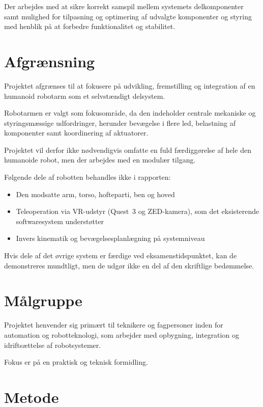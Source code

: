 Der arbejdes med at sikre korrekt samspil mellem systemets delkomponenter samt
mulighed for tilpasning og optimering af udvalgte komponenter og styring med
henblik på at forbedre funktionalitet og stabilitet.

\section{Afgrænsning}

Projektet afgrænses til at fokusere på udvikling, fremstilling og integration
af en humanoid robotarm som et selvstændigt delsystem.

Robotarmen er valgt som fokusområde, da den indeholder centrale mekaniske og
styringsmæssige udfordringer, herunder bevægelse i flere led, belastning af
komponenter samt koordinering af aktuatorer.

Projektet vil derfor ikke nødvendigvis omfatte en fuld færdiggørelse af hele
den humanoide robot, men der arbejdes med en modulær tilgang.

Følgende dele af robotten behandles ikke i rapporten:

\begin{itemize}
    \item Den modsatte arm, torso, hofteparti, ben og hoved
    \item Teleoperation via VR-udstyr (Quest~3 og ZED-kamera), som det
          eksisterende softwaresystem understøtter
    \item Invers kinematik og bevægelsesplanlægning på systemniveau
\end{itemize}

Hvis dele af det øvrige system er færdige ved eksamenstidspunktet, kan de
demonstreres mundtligt, men de udgør ikke en del af den skriftlige
bedømmelse.

\section{Målgruppe}

Projektet henvender sig primært til teknikere og fagpersoner inden for
automation og robotteknologi, som arbejder med opbygning, integration og
idriftsættelse af robotsystemer.

Fokus er på en praktisk og teknisk formidling.

\clearpage
\section{Metode}

